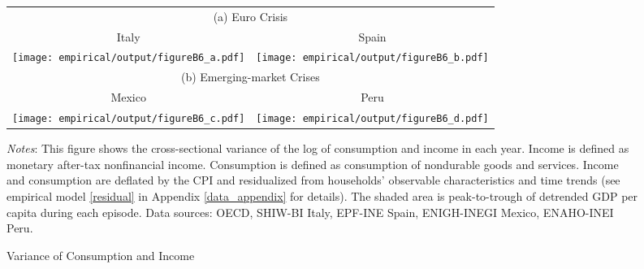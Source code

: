 \documentclass[12pt]{article}
\begin{document}
\begin{spacing}{1.5}
\begin{figure}[H]
	\begin{tabular}{cc}
		\multicolumn{2}{c}{(a) Euro Crisis} \vspace{.4em}  \\
		{\small{}{Italy} } & {\small{}{Spain} } \tabularnewline
		\texttt{[image: empirical/output/figureB6\_a.pdf]} &
		\texttt{[image: empirical/output/figureB6\_b.pdf]} \\
		\multicolumn{2}{c}{(b) Emerging-market Crises} \vspace{.4em} \\
		{\small{}{Mexico} } & {\small{}{Peru} }\tabularnewline
		\texttt{[image: empirical/output/figureB6\_c.pdf]} &
		\texttt{[image: empirical/output/figureB6\_d.pdf]} \\
	\end{tabular}\caption{Variance of Consumption and Income
		\label{fig_var_CY}}
	\medskip{}
	\raggedright{}\textit{\footnotesize{}Notes}{\footnotesize{}: This figure shows the cross-sectional variance of the log of consumption and income in each year. Income is defined as monetary after-tax nonfinancial income. Consumption is defined as consumption of nondurable goods and services. Income and consumption are deflated by the CPI and residualized from households' observable characteristics and time trends (see empirical model \eqref{residual} in Appendix \ref{data_appendix} for details). The shaded area is peak-to-trough of detrended GDP per capita during each episode. Data sources: OECD, SHIW-BI Italy, EPF-INE Spain, ENIGH-INEGI Mexico, ENAHO-INEI Peru.}{\footnotesize\par}
\end{figure}




\end{spacing}
\end{document}

